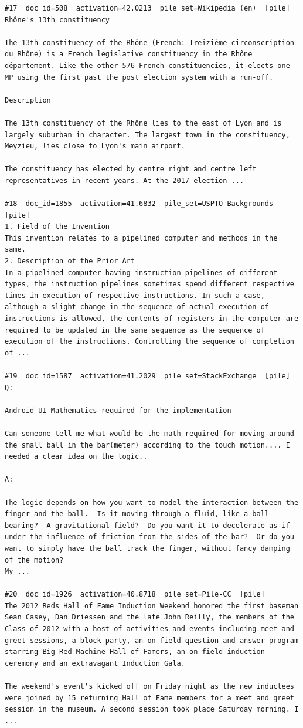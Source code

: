 \begin{verbatim}
#17  doc_id=508  activation=42.0213  pile_set=Wikipedia (en)  [pile]
Rhône's 13th constituency

The 13th constituency of the Rhône (French: Treizième circonscription du Rhône) is a French legislative constituency in the Rhône département. Like the other 576 French constituencies, it elects one MP using the first past the post election system with a run-off.

Description

The 13th constituency of the Rhône lies to the east of Lyon and is largely suburban in character. The largest town in the constituency, Meyzieu, lies close to Lyon's main airport.

The constituency has elected by centre right and centre left representatives in recent years. At the 2017 election ...

#18  doc_id=1855  activation=41.6832  pile_set=USPTO Backgrounds  [pile]
1. Field of the Invention
This invention relates to a pipelined computer and methods in the same.
2. Description of the Prior Art
In a pipelined computer having instruction pipelines of different types, the instruction pipelines sometimes spend different respective times in execution of respective instructions. In such a case, although a slight change in the sequence of actual execution of instructions is allowed, the contents of registers in the computer are required to be updated in the same sequence as the sequence of execution of the instructions. Controlling the sequence of completion of ...

#19  doc_id=1587  activation=41.2029  pile_set=StackExchange  [pile]
Q:

Android UI Mathematics required for the implementation

Can someone tell me what would be the math required for moving around the small ball in the bar(meter) according to the touch motion.... I needed a clear idea on the logic..

A:

The logic depends on how you want to model the interaction between the finger and the ball.  Is it moving through a fluid, like a ball bearing?  A gravitational field?  Do you want it to decelerate as if under the influence of friction from the sides of the bar?  Or do you want to simply have the ball track the finger, without fancy damping of the motion?
My ...

#20  doc_id=1926  activation=40.8718  pile_set=Pile-CC  [pile]
The 2012 Reds Hall of Fame Induction Weekend honored the first baseman Sean Casey, Dan Driessen and the late John Reilly, the members of the Class of 2012 with a host of activities and events including meet and greet sessions, a block party, an on-field question and answer program starring Big Red Machine Hall of Famers, an on-field induction ceremony and an extravagant Induction Gala.

The weekend's event's kicked off on Friday night as the new inductees were joined by 15 returning Hall of Fame members for a meet and greet session in the museum. A second session took place Saturday morning. I ...

\end{verbatim}

